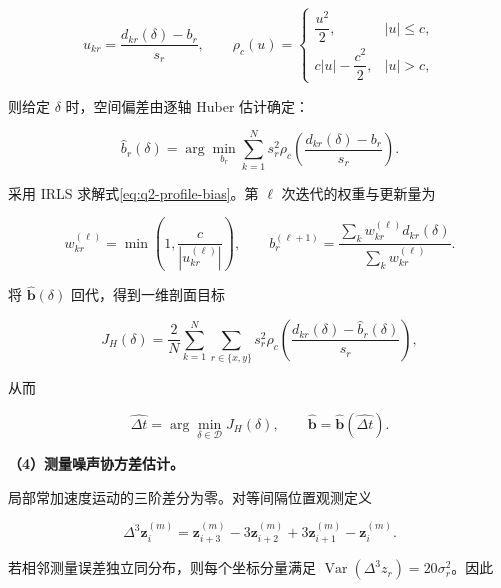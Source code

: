 \begin{equation}
u_{kr}=\frac{d_{kr}(\delta)-b_r}{s_r},\qquad
\rho_c(u)=
\begin{cases}
\dfrac{u^2}{2},& |u|\le c,\\[2mm]
c|u|-\dfrac{c^2}{2},& |u|>c,
\end{cases}
\label{eq:q2-huber-loss}
\end{equation}

则给定 \(\delta\) 时，空间偏差由逐轴 Huber 估计确定：

\begin{equation}
\widehat b_r(\delta)
=\arg\min_{b_r}
\sum_{k=1}^{N}s_r^2
\rho_c\!\left(
\frac{d_{kr}(\delta)-b_r}{s_r}
\right).
\label{eq:q2-profile-bias}
\end{equation}

采用 IRLS 求解式\eqref{eq:q2-profile-bias}。第 \(\ell\) 次迭代的权重与更新量为

\begin{equation}
w_{kr}^{(\ell)}=
\min\!\left(1,\frac{c}{|u_{kr}^{(\ell)}|}\right),
\qquad
b_r^{(\ell+1)}
=\frac{\sum_k w_{kr}^{(\ell)}d_{kr}(\delta)}
{\sum_k w_{kr}^{(\ell)}}.
\label{eq:q2-irls-bias}
\end{equation}

将 \(\widehat{\mathbf b}(\delta)\) 回代，得到一维剖面目标

\begin{equation}
J_H(\delta)=
\frac{2}{N}\sum_{k=1}^{N}\sum_{r\in\{x,y\}}
s_r^2\rho_c\!\left(
\frac{d_{kr}(\delta)-\widehat b_r(\delta)}{s_r}
\right),
\label{eq:q2-huber-objective}
\end{equation}

从而

\begin{equation}
\widehat{\Delta t}
=\arg\min_{\delta\in\mathcal D}J_H(\delta),
\qquad
\widehat{\mathbf b}
=\widehat{\mathbf b}(\widehat{\Delta t}).
\label{eq:q2-calibration-estimator}
\end{equation}

\noindent\textbf{（4）测量噪声协方差估计。}

局部常加速度运动的三阶差分为零。对等间隔位置观测定义

\begin{equation}
\Delta^3\mathbf z_i^{(m)}
=\mathbf z_{i+3}^{(m)}-3\mathbf z_{i+2}^{(m)}
+3\mathbf z_{i+1}^{(m)}-\mathbf z_i^{(m)}.
\label{eq:q2-third-difference}
\end{equation}

若相邻测量误差独立同分布，则每个坐标分量满足
\(\operatorname{Var}(\Delta^3 z_r)=20\sigma_r^2\)。因此

